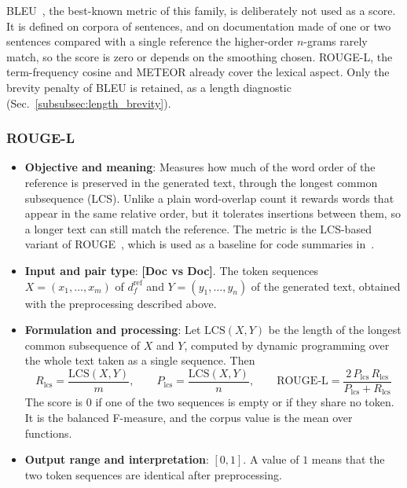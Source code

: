 BLEU~\cite{papineni_bleu_2002}, the best-known metric of this family, is deliberately not used as a
score. It is defined on corpora of sentences, and on documentation made of one or two sentences
compared with a single reference the higher-order $n$-grams rarely match, so the score is zero or
depends on the smoothing chosen. ROUGE-L, the term-frequency cosine and METEOR already cover the
lexical aspect. Only the brevity penalty of BLEU is retained, as a length diagnostic
(Sec.~\ref{subsubsec:length_brevity}).

\subsubsection{ROUGE-L}
\label{subsubsec:rouge_l}
\begin{itemize}[leftmargin=*, label=\textbullet]
	\item \textbf{Objective and meaning}: Measures how much of the word order of the reference is
	preserved in the generated text, through the longest common subsequence (LCS). Unlike a plain
	word-overlap count it rewards words that appear in the same relative order, but it tolerates
	insertions between them, so a longer text can still match the reference. The metric is the
	LCS-based variant of ROUGE~\cite{lin_rouge_2004}, which is used as a baseline for code
	summaries in~\cite{wu_can_2024}.

	\item \textbf{Input and pair type}: \textbf{[Doc vs Doc]}. The token sequences
	$X=(x_1,\dots,x_m)$ of $d_f^{\mathrm{ref}}$ and $Y=(y_1,\dots,y_n)$ of the generated text,
	obtained with the preprocessing described above.

	\item \textbf{Formulation and processing}: Let $\mathrm{LCS}(X,Y)$ be the length of the longest
	common subsequence of $X$ and $Y$, computed by dynamic programming over the whole text taken as a
	single sequence. Then
	\begin{equation}
		R_{\mathrm{lcs}} = \frac{\mathrm{LCS}(X,Y)}{m}, \qquad
		P_{\mathrm{lcs}} = \frac{\mathrm{LCS}(X,Y)}{n}, \qquad
		\text{ROUGE-L} = \frac{2\,P_{\mathrm{lcs}}\,R_{\mathrm{lcs}}}{P_{\mathrm{lcs}}+R_{\mathrm{lcs}}}
		\label{eq:rouge_l}
	\end{equation}
	The score is $0$ if one of the two sequences is empty or if they share no token. It is the
	balanced F-measure, and the corpus value is the mean over functions.

	\item \textbf{Output range and interpretation}: $[0,1]$. A value of $1$ means that the two
	token sequences are identical after preprocessing.


\end{itemize}
